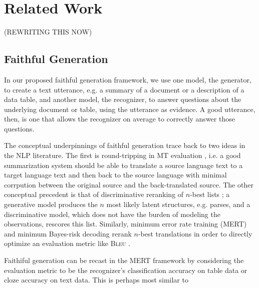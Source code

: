 \section{Related Work}

(REWRITING THIS NOW)


\subsection{Faithful Generation}

In our proposed faithful generation framework, we use one model, the 
generator, to
create a text utterance, e.g. a summary of a document or a description
of a data table, and another model, the recognizer, to answer questions 
about the underlying document or table, using the utterance as evidence.
A good utterance, then, is one that allows the recognizer on average to
correctly answer those questions.

The conceptual underpinnings of faithful generation trace back to two
ideas in the NLP literature. The first is round-tripping in MT evaluation 
\citep{somers2005round,rapp2009back}, i.e. a good summarization system should be able to translate
a source language text to a target language text and then back to the source
language with minimal corrpution between the original source and the 
back-translated source.
The other conceptual precedent is that of discriminative reranking 
of $n$-best lists \citep{collins2005discriminative,charniak2005coarse};
a generative model produces the $n$ most likely latent structures, e.g. parses,
and a discriminative model, which does not have the burden of modeling
the observations, rescores this list.
Similarly, minimum error rate training (MERT) \citep{och2003minimum} 
and minimum Bayes-risk decoding 
\citep{kumar2004minimum}
rerank $n$-best translations in order to directly optimize an evaluation
metric like \textsc{Bleu} \citep{papineni2002bleu}.

Faithiful generation can be recast in the MERT framework by considering
the evaluation metric to be the recognizer's classification accuracy on
table data or cloze accuracy on text data. This is perhaps most similar
to    



